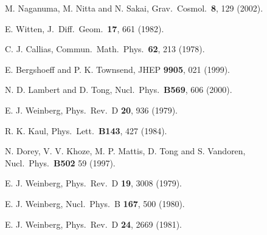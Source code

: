 \documentclass[a4paper,preprint,preprintnumbers,amsmath,amssymb]{revtex4}
\begin{document}
\begin{thebibliography}{99}
M. Naganuma, M. Nitta and N. Sakai,
Grav.\ Cosmol.\ {\bf 8}, 129 (2002). 

E. Witten, J.\ Diff.\ Geom.\ {\bf 17}, 661 (1982).
 
C. J. Callias, Commun.\ Math.\ Phys.\ {\bf 62}, 213 (1978).

E. Bergshoeff and P. K. Townsend, JHEP {\bf 9905}, 021 (1999).

N. D. Lambert and D. Tong, Nucl.\ Phys.\ {\bf B569}, 606 (2000).

E. J. Weinberg, Phys.\ Rev.\ D {\bf 20}, 936 (1979).

R. K. Kaul, Phys.\ Lett.\ {\bf B143}, 427 (1984).
 
N. Dorey, V. V. Khoze, M. P. Mattis, D. Tong and S. Vandoren,
Nucl.\ Phys.\ {\bf B502} 59 (1997).

E. J. Weinberg, Phys.\ Rev.\ D {\bf 19}, 3008 (1979).

E. J. Weinberg, Nucl.\ Phys.\ B {\bf 167}, 500 (1980).

E. J. Weinberg, Phys.\ Rev.\ D {\bf 24}, 2669 (1981).

\end{thebibliography}
\end{document}
